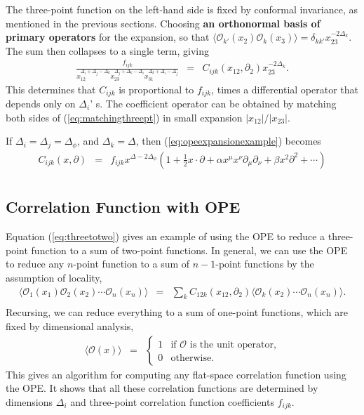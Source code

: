 \documentclass[12pt]{article}
\numberwithin{equation}{section}
\newcommand\be{\begin{eqnarray}}
\newcommand\ee{\end{eqnarray}}
\newcommand\f\phi
\newcommand\cO{\mathcal{O}}
\newcommand\p[1]{\left(#1\right)}
\newcommand\ptl\partial
\newcommand\<\langle
\renewcommand\>\rangle
\newcommand\de\delta
\newcommand\R{\mathbb{R}}
\newcommand\nn{\nonumber}
\renewcommand\.{\cdot}
\newcommand\x\times
\newcommand\De{\Delta}
\renewcommand\b\beta
\renewcommand\a\alpha
\begin{document}
The three-point function on the left-hand side is fixed by conformal invariance, as mentioned in the previous sections. Choosing \textbf{an orthonormal basis of primary operators} for the expansion, so that $\<\cO_{k'}(x_2)\cO_{k}(x_3)\>= \de_{kk'}x_{23}^{-2\De_k}$.  The sum then collapses to a single term, giving
\be
\label{eq:matchingthreept}
\frac{f_{ijk}}{x_{12}^{\De_i+\De_j-\De_k}x_{23}^{\De_j+\De_k-\De_i}x_{31}^{\De_k+\De_i-\De_j}} &=& C_{ijk}(x_{12},\ptl_2)x_{23}^{-2\De_k}.
\ee
This determines that $C_{ijk}$ is proportional to $f_{ijk}$, times a differential operator that depends only on $\De_i$' s. The coefficient operator can be obtained by matching both sides of (\ref{eq:matchingthreept}) in small expansion $|x_{12}|/|x_{23}|$.

If $\De_i=\De_j=\De_\f$, and $\De_k=\De$, then (\ref{eq:opeexpansionexample}) becomes
\be
\label{eq:identicalscalaropeoperator}
C_{ijk}(x,\ptl) &=& f_{ijk} x^{\De-2\De_\f}\p{1+\frac 1 2 x\.\ptl + \a x^\mu x^\nu\ptl_\mu\ptl_\nu + \b x^2 \ptl^2+\cdots}\nn\\
\ee


\subsection{Correlation Function with OPE}

Equation (\ref{eq:threetotwo}) gives an example of using the OPE to reduce a three-point function to a sum of two-point functions.  In general, we can use the OPE to reduce any $n$-point function to a sum of $n-1$-point functions by the assumption of locality,
\be
\<\cO_1(x_1)\cO_2(x_2)\cdots\cO_n(x_n)\> &=& \sum_k C_{12k}(x_{12},\ptl_2)\<\cO_k(x_2)\cdots\cO_n(x_n)\>.\nn\\
\ee
Recursing, we can reduce everything to a sum of one-point functions, which are fixed by dimensional analysis,
\be
\<\cO(x)\> &=& \begin{cases}
1 & \textrm{if $\cO$ is the unit operator,}\\
0 & \textrm{otherwise.}
\end{cases}
\ee
This gives an algorithm for computing any flat-space correlation function using the OPE\@.  It shows that all these correlation functions are determined by dimensions $\De_i$ and three-point correlation function coefficients $f_{ijk}$.
\end{document}
